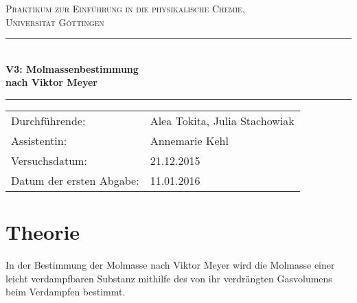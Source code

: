 \documentclass[12pt,a4paper,titlepage,headinclude,bibtotoc]{scrartcl}
\begin{document}
\begin{titlepage}
\centering
\textsc{\Large Praktikum zur Einführung in die physikalische Chemie,\\[1.5ex] Universität Göttingen}

\vspace*{2cm}

\rule{\textwidth}{1pt}\\[0.5cm]
{\huge \bfseries
  V3: Molmassenbestimmung\\[1.5ex]
  nach Viktor Meyer}\\[0.5cm]
\rule{\textwidth}{1pt}

\vspace*{1cm}


\begin{Large}
\begin{tabular}{ll}
Durchführende: &  Alea Tokita, Julia Stachowiak\\
Assistentin: & Annemarie Kehl\\
 Versuchsdatum: & 21.12.2015\\
 Datum der ersten Abgabe: & 11.01.2016
\end{tabular}
\end{Large}

\vspace*{2cm}

\begin{Large}
\end{Large}

\end{titlepage}

\tableofcontents

\newpage
\section{Theorie}
In der Bestimmung der Molmasse nach Viktor Meyer wird die Molmasse einer leicht verdampfbaren Substanz mithilfe des von ihr verdrängten Gasvolumens beim Verdampfen bestimmt.
\end{document}
